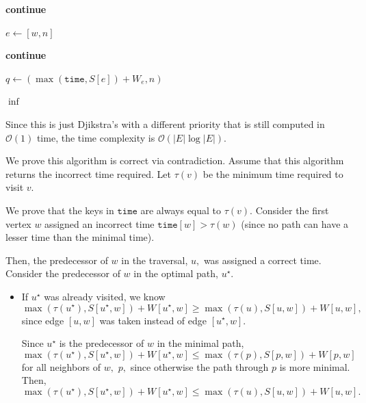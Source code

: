 \documentclass[12pt]{article}
\begin{document}
\begin{enumerate}
\begin{algorithm}
\begin{algorithmic}
        \vspace{3mm}

        \State \textbf{continue}
        \EndIf

        \vspace{3mm}

        \State $e \gets [w, n]$

        \State \textbf{continue}
        \EndIf

        \vspace{3mm}

        \State $q \gets (\max(\texttt{time}, S[e]) + W_e, n)$
        \EndFor
        \EndWhile

        \vspace{3mm}

        \State \Return $\inf$
        \EndProcedure
      \end{algorithmic}
    \end{algorithm}

    Since this is just Djikstra's with a different priority that is
    still computed in $\mathcal O(1)$ time, the time complexity is
    $\mathcal O(|E| \log |E|).$

    We prove this algorithm is correct via contradiction. Assume that
    this algorithm returns the incorrect time required. Let $\tau
    (v)$ be the minimum time required to visit $v.$

    We prove that the keys in $\texttt{time}$ are always equal to
    $\tau(v).$ Consider the first vertex $w$ assigned an incorrect
    time $\texttt{time}[w] > \tau(w)$ (since no path can have a
    lesser time than the minimal time).

    Then, the predecessor of $w$ in the traversal, $u,$ was assigned
    a correct time. Consider the predecessor of $w$ in the optimal
    path, $u^\star.$

    \begin{itemize}
      \item If $u^\star$ was already visited, we know
        $$
        \max(\tau(u^\star), S[u^\star, w]) + W[u^\star, w] \geq
        \max(\tau(u), S[u, w]) + W[u, w],
        $$
        since edge $[u, w]$ was taken instead of edge $[u^\star, w].$

        Since $u^\star$ is the predecessor of $w$ in the minimal path, $$
        \max(\tau(u^\star), S[u^\star, w]) + W[u^\star, w] \leq
        \max(\tau(p), S[p, w]) + W[p, w]
        $$
        for all neighbors of $w,$ $p,$ since otherwise the path
        through $p$ is more minimal. Then,
        $$
        \max(\tau(u^\star), S[u^\star, w]) + W[u^\star, w] \leq
        \max(\tau(u), S[u, w]) + W[u, w].
        $$


\end{itemize}
\end{enumerate}
\end{document}
